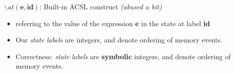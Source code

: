 $\backslash{}at(\mathbf{e}, \mathbf{id})$: Built-in ACSL construct \emph{(abused a bit)}
\begin{itemize}
    \item referring to the value of the expression \textbf{e} in the state at label \textbf{id}~\cite{ACSL}
    \item Our \emph{state labels} are integers, and denote ordering of memory events.
    \item Correctness: \emph{state labels} are \textbf{symbolic} integers, and denote ordering of memory events.
\end{itemize}
